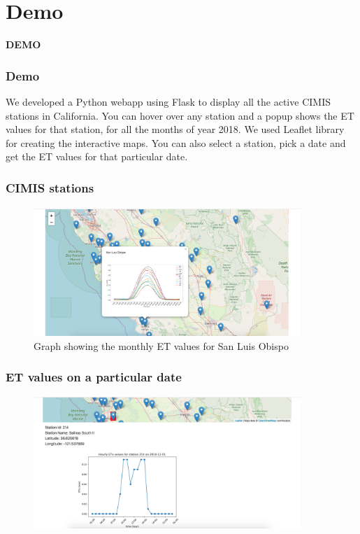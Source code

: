 \section{Demo}
\begin{frame}
	\begin{center}
		{\fontsize{20}{20}\selectfont
			\textbf{DEMO}
		}
	\end{center}
\end{frame}

\begin{frame}
\frametitle{Demo}
We developed a Python webapp using Flask to display all the active CIMIS stations in California. You can hover over any station and a popup shows the ET values for that station, for all the months of year 2018. We used Leaflet library for creating the interactive maps. You can also select a station, pick a date and get the ET values for that particular date. 
\end{frame}

\begin{frame}
	\frametitle{CIMIS stations}
	\centering
	\begin{figure}
		\includegraphics[width=0.9\textwidth]{images/fig1.png}
		\caption{Graph showing the monthly ET values for San Luis Obispo}\label{fig:fig1}
	\end{figure}
\end{frame}

\begin{frame}
	\frametitle{ET values on a particular date}
	\centering
	\begin{figure}
		\includegraphics[width=0.9\textwidth]{images/fig2.png}
	\end{figure}
\end{frame}


